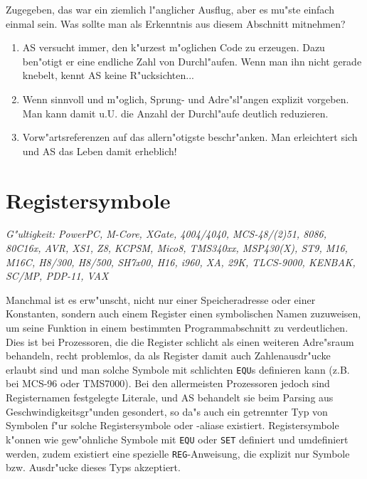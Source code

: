 \documentclass[12pt,a4paper,twoside]{report}
\makeatletter
\newcommand{\tty}[1]{{\tt #1}}
\newcommand{\ttindex}[1]{\index{#1@{\tt #1}}}
\newcommand{\asname}{AS}
\makeatother
\begin{document}
Zugegeben, das war ein ziemlich l"anglicher Ausflug, aber es mu"ste einfach
einmal sein.  Was sollte man als Erkenntnis aus diesem Abschnitt mitnehmen?
\begin{enumerate}
\item{\asname{} versucht immer, den k"urzest m"oglichen Code zu erzeugen.  Dazu
      ben"otigt er eine endliche Zahl von Durchl"aufen.  Wenn man ihn
      nicht gerade knebelt, kennt \asname{} keine R"ucksichten...}
\item{Wenn sinnvoll und m"oglich, Sprung- und Adre"sl"angen explizit
      vorgeben.  Man kann damit u.U. die Anzahl der Durchl"aufe deutlich
      reduzieren.}
\item{Vorw"artsreferenzen auf das allern"otigste beschr"anken.  Man
      erleichtert sich und \asname{} das Leben damit erheblich!}
\end{enumerate}


\section{Registersymbole}
\label{SectRegSyms} \ttindex{Registersymbole}

{\em G"ultigkeit: PowerPC, M-Core, XGate, 4004/4040, MCS-48/(2)51, 8086,
     80C16x, AVR, XS1, Z8, KCPSM, Mico8, TMS340xx, MSP430(X), ST9, M16,
     M16C, H8/300, H8/500, SH7x00, H16, i960, XA, 29K, TLCS-9000, KENBAK,
     SC/MP, PDP-11, VAX}

Manchmal ist es erw"unscht, nicht nur einer Speicheradresse oder einer
Konstanten, sondern auch einem Register einen symbolischen Namen zuzuweisen,
um seine Funktion in einem bestimmten Programmabschnitt zu verdeutlichen.
Dies ist bei Prozessoren, die die Register schlicht als einen weiteren
Adre"sraum behandeln, recht problemlos, da als Register damit auch
Zahlenausdr"ucke erlaubt sind und man solche Symbole mit schlichten
\tty{EQU}s definieren kann (z.B. bei MCS-96 oder TMS7000).  Bei den
allermeisten Prozessoren jedoch sind Registernamen festgelegte Literale, und
\asname{} behandelt sie beim Parsing aus Geschwindigkeitsgr"unden gesondert, so da"s auch
ein getrennter Typ von Symbolen f"ur solche Registersymbole oder -aliase existiert.
Registersymbole k"onnen wie gew"ohnliche Symbole mit \tty{EQU} oder \tty{SET}
definiert und umdefiniert werden, zudem existiert eine spezielle \tty{REG}-Anweisung,
die explizit nur Symbole bzw. Ausdr"ucke dieses Typs akzeptiert.
\end{document}
